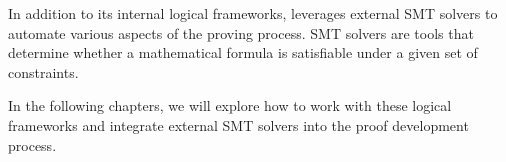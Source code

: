 In addition to its internal logical frameworks, \EasyCrypt leverages external SMT solvers to automate various aspects of the proving process. SMT solvers are tools that determine whether a mathematical formula is satisfiable under a given set of constraints.

In the following chapters, we will explore how to work with these logical frameworks and integrate external SMT solvers into the proof development process.

